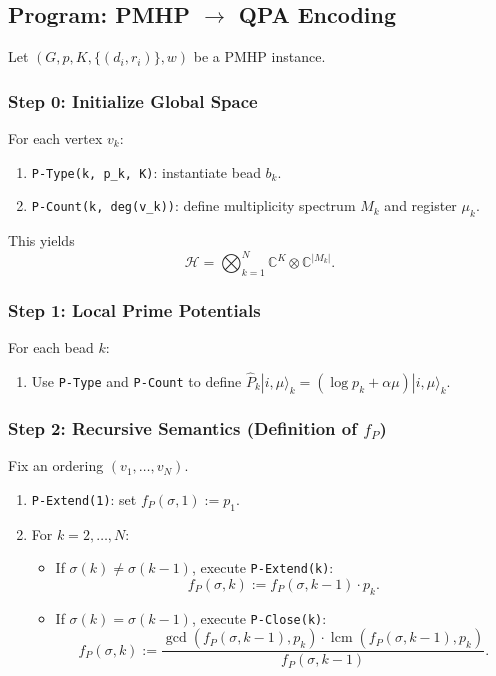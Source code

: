 \documentclass[11pt]{article}
\begin{document}
\subsection{Program: PMHP $\to$ QPA Encoding}

Let $(G,p,K,\{(d_i,r_i)\},w)$ be a PMHP instance.

\subsubsection*{Step 0: Initialize Global Space}

For each vertex $v_k$:

\begin{enumerate}[label=(0.\arabic*)]
  \item \texttt{P-Type(k, p\_k, K)}: instantiate bead $b_k$.
  \item \texttt{P-Count(k, deg(v\_k))}: define multiplicity spectrum $M_k$ and register $\mu_k$.
\end{enumerate}

This yields
\[
  \mathcal{H} = \bigotimes_{k=1}^N \mathbb{C}^K \otimes \mathbb{C}^{|M_k|}.
\]

\subsubsection*{Step 1: Local Prime Potentials}

For each bead $k$:

\begin{enumerate}[label=(1.\arabic*)]
  \item Use \texttt{P-Type} and \texttt{P-Count} to define $\hat{P}_k|i,\mu\rangle_k
    = (\log p_k + \alpha \mu)|i,\mu\rangle_k$.
\end{enumerate}

\subsubsection*{Step 2: Recursive Semantics (Definition of $f_P$)}

Fix an ordering $(v_1,\dots,v_N)$.

\begin{enumerate}[label=(2.\arabic*)]
  \item \texttt{P-Extend(1)}: set $f_P(\sigma,1) := p_1$.
  \item For $k=2,\dots,N$:
  \begin{itemize}
    \item If $\sigma(k)\neq\sigma(k-1)$, execute \texttt{P-Extend(k)}:
    \[
      f_P(\sigma,k) := f_P(\sigma,k-1)\cdot p_k.
    \]
    \item If $\sigma(k)=\sigma(k-1)$, execute \texttt{P-Close(k)}:
    \[
      f_P(\sigma,k) := \frac{\gcd(f_P(\sigma,k-1),p_k)\cdot
                             \operatorname{lcm}(f_P(\sigma,k-1),p_k)}
                            {f_P(\sigma,k-1)}.
    \]
  \end{itemize}
\end{enumerate}
\end{document}
